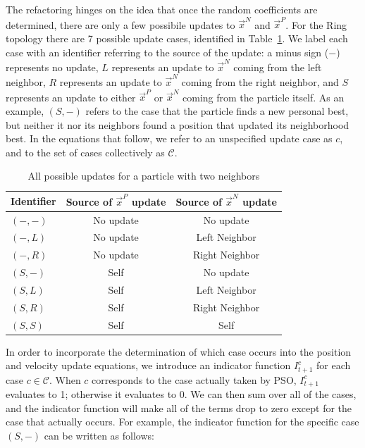 \documentclass[journal,letterpaper]{IEEEtran}
\providecommand{\pers}{\ensuremath{P}}
\providecommand{\neigh}{\ensuremath{N}}
\providecommand{\leftind}{\ensuremath{L}}
\providecommand{\rightind}{\ensuremath{R}}
\providecommand{\nbest}{\ensuremath{\Vec{x}^\neigh}}
\providecommand{\pbest}{\ensuremath{\Vec{x}^\pers}}
\providecommand{\indic}{\ensuremath{I}}
\providecommand{\caseset}{\ensuremath{\mathcal{C}}}
\providecommand{\casegen}{\ensuremath{c}}
\providecommand{\casexn}{\ensuremath{(S,-)}}
\providecommand{\casexx}{\ensuremath{(S,S)}}
\providecommand{\casexl}{\ensuremath{(S,\leftind)}}
\providecommand{\casexr}{\ensuremath{(S,\rightind)}}
\providecommand{\casepn}{\ensuremath{(-,-)}}
\providecommand{\casepl}{\ensuremath{(-,\leftind)}}
\providecommand{\casepr}{\ensuremath{(-,\rightind)}}
\begin{document}
The refactoring hinges on the idea that once the random coefficients are
determined, there are only a few possibile updates to $\nbest$ and $\pbest$.
For the Ring topology there are 7 possible update cases, identified in
Table~\ref{tab:evals}.  We label each case with an identifier referring to the
source of the update: a minus sign ($-$) represents no update, $L$ represents
an update to $\nbest$ coming from the left neighbor, $R$ represents an update
to $\nbest$ coming from the right neighbor, and $S$ represents an update to
either $\pbest$ or $\nbest$ coming from the particle itself.  As an example,
$\casexn$ refers to the case that the particle finds a new personal best, but
neither it nor its neighbors found a position that updated its neighborhood
best.  In the equations that follow, we refer to an unspecified update case as
$\casegen$, and to the set of cases collectively as $\caseset$.

\begin{table}
  \caption{All possible updates for a particle with two neighbors}
  \label{tab:evals}
  \centering
  \begin{tabular}{lcc}
	Identifier&Source of $\pbest$ update&Source of $\nbest$ update\\
	\hline
	\hline
	$\casepn$&No update&No update\\
	\hline
	$\casepl$&No update&Left Neighbor\\
	\hline
	$\casepr$&No update&Right Neighbor\\
	\hline
	$\casexn$&Self&No update\\
	\hline
	$\casexl$&Self&Left Neighbor\\
	\hline
	$\casexr$&Self&Right Neighbor\\
	\hline
	$\casexx$&Self&Self\\
	\hline
  \end{tabular}
\end{table}

In order to incorporate the determination of which case occurs into the
position and velocity update equations, we introduce an indicator function
$\indic_{t+1}^{\casegen}$ for each case $\casegen \in \caseset$.  When
$\casegen$ corresponds to the case actually taken by PSO,
$\indic_{t+1}^{\casegen}$ evaluates to 1; otherwise it evaluates to 0.  We can
then sum over all of the cases, and the indicator function will make all of the
terms drop to zero except for the case that actually occurs.  For example, the
indicator function for the specific case $\casexn$ can be written as follows:
\end{document}
